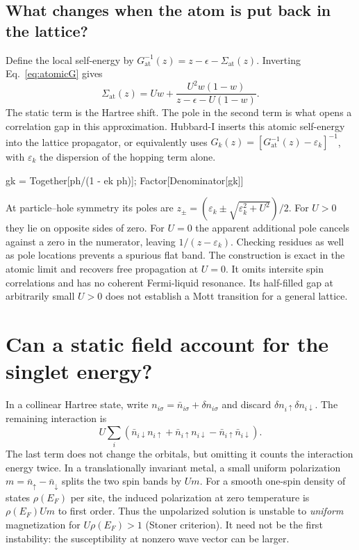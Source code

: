 \subsection{What changes when the atom is put back in the lattice?}
Define the local self-energy by
$G_\mathrm{at}^{-1}(z)=z-\epsilon-\Sigma_\mathrm{at}(z)$. Inverting
Eq.~\eqref{eq:atomicG} gives
\[
 \Sigma_\mathrm{at}(z)=Uw+
 \frac{U^2 w(1-w)}{z-\epsilon-U(1-w)} .
\]
The static term is the Hartree shift. The pole in the second term is
what opens a correlation gap in this approximation. Hubbard-I inserts
this atomic self-energy into the lattice propagator, or equivalently
uses $G_k(z)=[G_\mathrm{at}^{-1}(z)-\varepsilon_k]^{-1}$, with
$\varepsilon_k$ the dispersion of the hopping term alone.
\begin{wl}
gk = Together[ph/(1 - ek ph)];
Factor[Denominator[gk]]
\end{wl}
At particle--hole symmetry its poles are
$z_\pm=(\varepsilon_k\pm\sqrt{\varepsilon_k^2+U^2})/2$.
For $U>0$ they lie on opposite sides of zero. For $U=0$ the apparent
additional pole cancels against a zero in the numerator, leaving
$1/(z-\varepsilon_k)$. Checking residues as well as pole locations
prevents a spurious flat band. The construction is exact in the atomic
limit and recovers free propagation at $U=0$. It omits intersite
spin correlations and has no coherent Fermi-liquid resonance. Its
half-filled gap at arbitrarily small $U>0$ does not establish a Mott
transition for a general lattice.

\section{Can a static field account for the singlet energy?}
In a collinear Hartree state, write $n_{i\sigma}=\bar n_{i\sigma}
+\delta n_{i\sigma}$ and discard
$\delta n_{i\uparrow}\delta n_{i\downarrow}$. The remaining interaction is
\begin{equation}
 U\sum_i(\bar n_{i\downarrow} n_{i\uparrow}+
          \bar n_{i\uparrow} n_{i\downarrow}-
          \bar n_{i\uparrow}\bar n_{i\downarrow}).
\end{equation}
The last term does not change the orbitals, but omitting it counts
the interaction energy twice. In a translationally invariant metal,
a small uniform polarization $m=\bar n_\uparrow-\bar n_\downarrow$
splits the two spin bands by $Um$. For a smooth one-spin density of
states $\rho(E_F)$ per site, the induced polarization at zero
temperature is $\rho(E_F)Um$ to first order. Thus the unpolarized
solution is unstable to \emph{uniform} magnetization for
$U\rho(E_F)>1$ (Stoner criterion). It need not be the first
instability: the susceptibility at nonzero wave vector can be larger.

